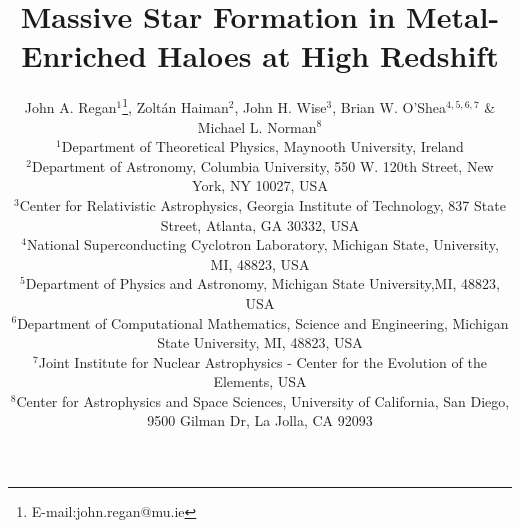 \documentclass[graphics, twocolumn, usenatbib]{mn2e}
\begin{document}
\title{Massive Star Formation in Metal-Enriched Haloes at High Redshift}
\author[J. A. Regan, Z. Haiman, J. H. Wise, B.W. O'Shea \&  M.L. Norman]{John A. Regan$^{1}$\thanks{E-mail:john.regan@mu.ie}, Zolt\'an Haiman$^{2}$,
  John H. Wise$^{3}$, Brian W. O'Shea$^{4,5,6,7}$ \newauthor \& Michael L. Norman$^8$\\
  $^1$Department of Theoretical Physics, Maynooth University, Ireland\\
  $^2$Department of Astronomy, Columbia University, 550 W. 120th Street, New York, NY 10027, USA\\
  $^3$Center for Relativistic Astrophysics, Georgia Institute of Technology, 837 State Street, Atlanta, GA 30332, USA\\
  $^4$National Superconducting Cyclotron Laboratory, Michigan State, University, MI, 48823, USA\\
  $^5$Department of Physics and Astronomy, Michigan State University,MI, 48823, USA\\
  $^6$Department of Computational Mathematics, Science and Engineering, Michigan State University, MI, 48823, USA\\    
  $^7$Joint Institute for Nuclear Astrophysics - Center for the Evolution of the Elements, USA\\
  $^8$Center for Astrophysics and Space Sciences, University of California, San Diego, 9500 Gilman Dr, La Jolla, CA 92093\\}

\label{firstpage}
\pagerange{\pageref{firstpage}--\pageref{lastpage}}
\maketitle
\end{document}
